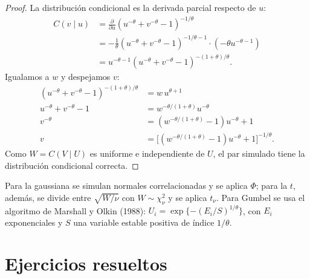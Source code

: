 \begin{proof}
La distribución condicional es la derivada parcial respecto de $u$:
\begin{align*}
  C(v\mid u) &= \frac{\partial}{\partial u}(u^{-\theta}+v^{-\theta}-1)^{-1/\theta}\\
             &= -\frac1\theta(u^{-\theta}+v^{-\theta}-1)^{-1/\theta-1}\cdot(-\theta u^{-\theta-1})\\
             &= u^{-\theta-1}(u^{-\theta}+v^{-\theta}-1)^{-(1+\theta)/\theta}.
\end{align*}
Igualamos a $w$ y despejamos $v$:
\begin{align*}
  (u^{-\theta}+v^{-\theta}-1)^{-(1+\theta)/\theta} &= w\,u^{\theta+1}\\
  u^{-\theta}+v^{-\theta}-1 &= w^{-\theta/(1+\theta)}u^{-\theta}\\
  v^{-\theta} &= (w^{-\theta/(1+\theta)}-1)u^{-\theta}+1\\
  v &= \bigl[(w^{-\theta/(1+\theta)}-1)u^{-\theta}+1\bigr]^{-1/\theta}.
\end{align*}
Como $W=C(V\mid U)$ es uniforme e independiente de $U$, el par simulado tiene la distribución condicional correcta.
\end{proof}

Para la gaussiana se simulan normales correlacionadas y se aplica $\Phi$; para la $t$, además, se divide entre
$\sqrt{W/\nu}$ con $W\sim\chi^2_\nu$ y se aplica $t_\nu$. Para Gumbel se usa el algoritmo de Marshall y Olkin (1988):
$U_i=\exp\{-(E_i/S)^{1/\theta}\}$, con $E_i$ exponenciales y $S$ una variable estable positiva de índice $1/\theta$.

\section{Ejercicios resueltos}

